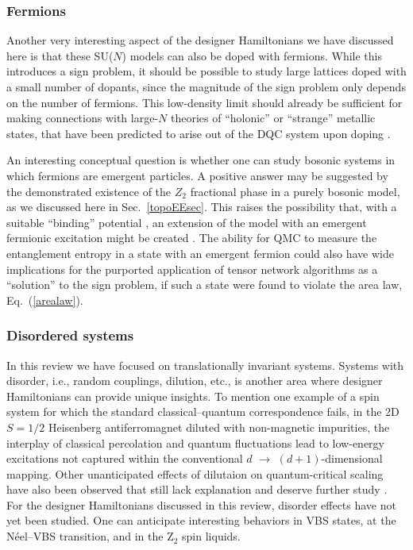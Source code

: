 \documentclass[range]{ar2e}
\begin{document}
\subsubsection{Fermions}

Another very interesting aspect of the designer Hamiltonians we have discussed here is that these SU($N$) models can also be doped with fermions. While this 
introduces a sign problem, it should be possible to study large lattices doped with a small number of dopants, since the magnitude of the 
sign problem only depends on the number of fermions. This low-density limit should already be sufficient for making connections with 
large-$N$ theories of ``holonic'' or ``strange'' metallic states, that have been predicted to arise out of the DQC system upon 
doping \cite{kaul2008:u1}.

An interesting conceptual question is whether one can study bosonic systems in which fermions are emergent particles.
A positive answer may be suggested by the demonstrated existence of the $Z_2$ fractional phase in a purely bosonic model, as we
discussed here in Sec.~\ref{topoEEsec}. This raises the possibility that, with a suitable ``binding'' potential \cite{FermionBind}, an extension of 
the model with an emergent fermionic excitation might be created \cite{Wenbook}.  
The ability for QMC to measure the entanglement entropy in a state with an emergent fermion
could also have wide implications for the purported application of tensor network algorithms as a ``solution'' to the sign problem, 
if such a state were found to violate the area law, Eq.~(\ref{arealaw}). 

\subsubsection{Disordered systems}

In this review we have focused on translationally invariant systems. Systems with disorder, i.e., random couplings, dilution, etc., is another area
where designer Hamiltonians can provide unique insights. To mention one example of a spin system for which the standard classical--quantum correspondence 
fails, in the 2D $S=1/2$ Heisenberg antiferromagnet diluted with non-magnetic impurities, the interplay of classical percolation and quantum fluctuations 
lead to low-energy excitations \cite{Wang10} not captured \cite{Vojta05} within the conventional $d$ $\to$ $(d+1)$-dimensional mapping. Other unanticipated 
effects of dilutaion on quantum-critical scaling have also been observed that still lack explanation and deserve further study \cite{Sandvik06,Yao10}. 
For the designer Hamiltonians discussed in this review, disorder effects have not yet been studied. One can anticipate interesting behaviors in VBS states, 
at the N\'eel--VBS transition, and in the Z$_2$ spin liquids. 
\end{document}

